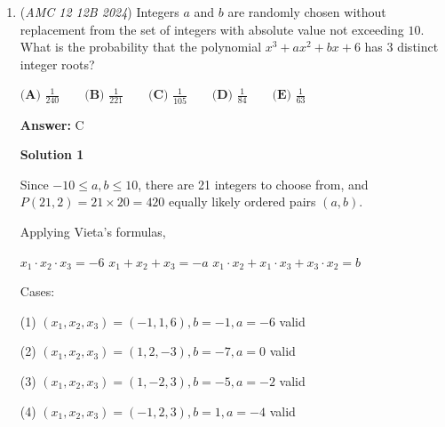 \begin{enumerate}
 Within each group of $4$, the first two positions in the line are assigned as the chairperson and the secretary, while the remaining two are ordinary members. Since the roles of chairperson and secretary are distinct, but the order of the remaining two members does not matter, we divide by $2$ for each group. Thus, we divide by $2^4$ to account for all $4$ committees.  

 The total number of ways to assign people into committees with roles is given by:
 \[\frac{16!}{4! \cdot 2^4}.\]  (This is equivalent to Solution 1's $\frac{16!}{(4!)^5} \cdot 12^4$.)

 To find $r$, we use Legendre's Formula to count the total power of $3$ in $16!$:  
 \[\lfloor \frac{16}{3} \rfloor + \lfloor \frac{16}{9} \rfloor = 5 + 1 = 6.\]  Each $4!$ contributes one factor of $3$, and since we divide by $4!$ a total of $1$ times, we subtract $1$ from $6$:  
 \[6 - 1 = 5.\]  Thus, the value of $r$ is $\boxed{5}$.~ryk

 \textbf{Fast Solution} 


	\item (\textit{AMC 12 12B 2024}) Integers $a$ and $b$ are randomly chosen without replacement from the set of integers with absolute value not exceeding $10$. What is the probability that the polynomial $x^3 + ax^2 + bx + 6$ has $3$ distinct integer roots?


 $\textbf{(A) }\frac{1}{240} \qquad \textbf{(B) }\frac{1}{221} \qquad \textbf{(C) }\frac{1}{105} \qquad \textbf{(D) }\frac{1}{84} \qquad \textbf{(E) }\frac{1}{63}$

 \textbf{Answer: }C



\textbf{Solution 1}

Since $-10 \le a,b \le 10$, there are 21 integers to choose from, and $P(21,2) = 21 \times 20 = 420$ equally likely ordered pairs $(a,b)$.

 Applying Vieta's formulas, 

 $x_1 \cdot x_2  \cdot x_3  = -6$
$x_1 + x_2+ x_3 = -a$
$x_1 \cdot x_2 + x_1 \cdot x_3  + x_3 \cdot x_2  = b$

 Cases:

 (1)  $(x_1,x_2,x_3)  = (-1,1,6) , b = -1, a=-6$  valid 

 (2)  $(x_1,x_2,x_3)  = ( 1,2,-3) , b = -7, a=0$  valid 

 (3)  $(x_1,x_2,x_3)  = (1,-2,3) , b = -5, a=-2$  valid 

 (4)  $(x_1,x_2,x_3)  = (-1,2,3) , b = 1, a=-4$  valid 


\end{enumerate}

